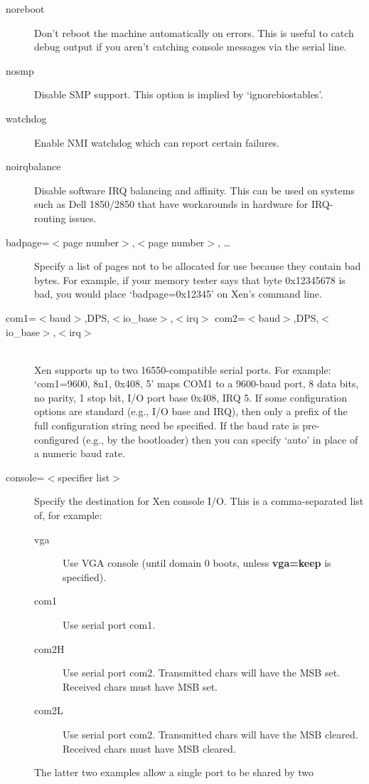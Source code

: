 \documentclass[11pt,twoside,final,openright]{report}
\begin{document}
\begin{description}
\item [ noreboot ] Don't reboot the machine automatically on errors.
  This is useful to catch debug output if you aren't catching console
  messages via the serial line.
\item [ nosmp ] Disable SMP support.  This option is implied by
  `ignorebiostables'.
\item [ watchdog ] Enable NMI watchdog which can report certain
  failures.
\item [ noirqbalance ] Disable software IRQ balancing and affinity.
  This can be used on systems such as Dell 1850/2850 that have
  workarounds in hardware for IRQ-routing issues.
\item [ badpage=$<$page number$>$,$<$page number$>$, \ldots ] Specify
  a list of pages not to be allocated for use because they contain bad
  bytes. For example, if your memory tester says that byte 0x12345678
  is bad, you would place `badpage=0x12345' on Xen's command line.
\item [ com1=$<$baud$>$,DPS,$<$io\_base$>$,$<$irq$>$
  com2=$<$baud$>$,DPS,$<$io\_base$>$,$<$irq$>$ ] \mbox{}\\
  Xen supports up to two 16550-compatible serial ports.  For example:
  `com1=9600, 8n1, 0x408, 5' maps COM1 to a 9600-baud port, 8 data
  bits, no parity, 1 stop bit, I/O port base 0x408, IRQ 5.  If some
  configuration options are standard (e.g., I/O base and IRQ), then
  only a prefix of the full configuration string need be specified. If
  the baud rate is pre-configured (e.g., by the bootloader) then you
  can specify `auto' in place of a numeric baud rate.
\item [ console=$<$specifier list$>$ ] Specify the destination for Xen
  console I/O.  This is a comma-separated list of, for example:
  \begin{description}
  \item[ vga ] Use VGA console (until domain 0 boots, unless {\bf
  vga=keep } is specified).
  \item[ com1 ] Use serial port com1.
  \item[ com2H ] Use serial port com2. Transmitted chars will have the
    MSB set. Received chars must have MSB set.
  \item[ com2L] Use serial port com2. Transmitted chars will have the
    MSB cleared. Received chars must have MSB cleared.
  \end{description}
  The latter two examples allow a single port to be shared by two

\end{description}
\end{document}
